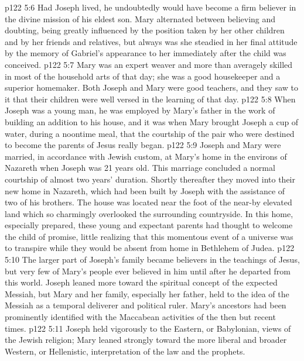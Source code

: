 \vs p122 5:6 Had Joseph lived, he undoubtedly would have become a firm believer in the divine mission of his eldest son. Mary alternated between believing and doubting, being greatly influenced by the position taken by her other children and by her friends and relatives, but always was she steadied in her final attitude by the memory of Gabriel’s appearance to her immediately after the child was conceived.
\vs p122 5:7 Mary was an expert weaver and more than averagely skilled in most of the household arts of that day; she was a good housekeeper and a superior homemaker. Both Joseph and Mary were good teachers, and they saw to it that their children were well versed in the learning of that day.
\vs p122 5:8 \pc When Joseph was a young man, he was employed by Mary’s father in the work of building an addition to his house, and it was when Mary brought Joseph a cup of water, during a noontime meal, that the courtship of the pair who were destined to become the parents of Jesus really began.
\vs p122 5:9 Joseph and Mary were married, in accordance with Jewish custom, at Mary’s home in the environs of Nazareth when Joseph was 21 years old. This marriage concluded a normal courtship of almost two years’ duration. Shortly thereafter they moved into their new home in Nazareth, which had been built by Joseph with the assistance of two of his brothers. The house was located near the foot of the near\hyp{}by elevated land which so charmingly overlooked the surrounding countryside. In this home, especially prepared, these young and expectant parents had thought to welcome the child of promise, little realizing that this momentous event of a universe was to transpire while they would be absent from home in Bethlehem of Judea.
\vs p122 5:10 \pc The larger part of Joseph’s family became believers in the teachings of Jesus, but very few of Mary’s people ever believed in him until after he departed from this world. Joseph leaned more toward the spiritual concept of the expected Messiah, but Mary and her family, especially her father, held to the idea of the Messiah as a temporal deliverer and political ruler. Mary’s ancestors had been prominently identified with the Maccabean activities of the then but recent times.
\vs p122 5:11 Joseph held vigorously to the Eastern, or Babylonian, views of the Jewish religion; Mary leaned strongly toward the more liberal and broader Western, or Hellenistic, interpretation of the law and the prophets.
